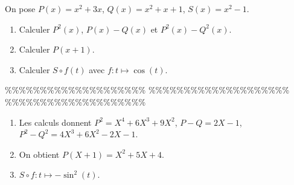 



\begin{exercice}  \;
On pose $P(x)=x^2+3x$, $Q(x)=x^2+x+1$, $S(x)=x^2-1$.
\begin{enumerate}
 \item Calculer $P^2(x)$, $P(x)-Q(x)$ et $P^2(x)-Q^2(x)$.
\item Calculer $P(x+1)$.
\item Calculer $S\circ f(t)$ avec $f: t\mapsto \cos{(t)}$.
\end{enumerate}
\end{exercice}


\%\%\%\%\%\%\%\%\%\%\%\%\%\%\%\%\%\%\%\%
\%\%\%\%\%\%\%\%\%\%\%\%\%\%\%\%\%\%\%\%
\%\%\%\%\%\%\%\%\%\%\%\%\%\%\%\%\%\%\%\%



\begin{correction}  \;
\begin{enumerate}
\item Les calculs donnent $P^2=X^4+6X^3+9X^2$, $P-Q=2X-1$, $P^2-Q^2=4X^3+6X^2-2X-1$.
\item On obtient $P(X+1)=X^2+5X+4$.
\item $S\circ f : t \mapsto -\sin^2(t) $.
\end{enumerate}
\end{correction}